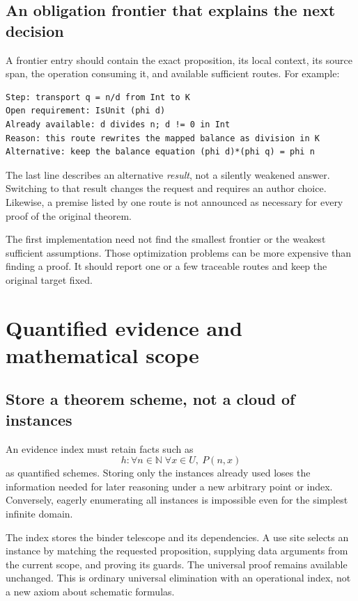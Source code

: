 \documentclass[11pt,a4paper]{article}
\newcommand{\N}{\mathbb N}
\theoremstyle{definition}
\theoremstyle{remark}
\begin{document}
\subsection{An obligation frontier that explains the next decision}

A frontier entry should contain the exact proposition, its local context,
its source span, the operation consuming it, and available sufficient routes.
For example:
\begin{lstlisting}
Step: transport q = n/d from Int to K
Open requirement: IsUnit (phi d)
Already available: d divides n; d != 0 in Int
Reason: this route rewrites the mapped balance as division in K
Alternative: keep the balance equation (phi d)*(phi q) = phi n
\end{lstlisting}
The last line describes an alternative \emph{result}, not a silently weakened
answer. Switching to that result changes the request and requires an author
choice. Likewise, a premise listed by one route is not announced as necessary
for every proof of the original theorem.

The first implementation need not find the smallest frontier or the weakest
sufficient assumptions. Those optimization problems can be more expensive
than finding a proof. It should report one or a few traceable routes and keep
the original target fixed.

\section{Quantified evidence and mathematical scope}\label{sec:quantified}

\subsection{Store a theorem scheme, not a cloud of instances}

An evidence index must retain facts such as
\[
 h:\forall n\in\N\;\forall x\in U,\ P(n,x)
\]
as quantified schemes. Storing only the instances already used loses the
information needed for later reasoning under a new arbitrary point or index.
Conversely, eagerly enumerating all instances is impossible even for the
simplest infinite domain.

The index stores the binder telescope and its dependencies. A use site selects
an instance by matching the requested proposition, supplying data arguments
from the current scope, and proving its guards. The universal proof remains
available unchanged. This is ordinary universal elimination with an operational
index, not a new axiom about schematic formulas.
\end{document}
